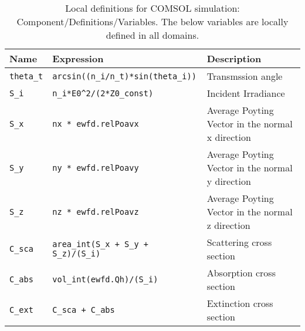 \begin{table}[b!]
\caption{Local definitions for COMSOL simulation: Component/Definitions/Variables. The below variables are locally defined in all domains. }
\label{tab:Domain-parameters}
\centering
\begin{tabular}{ |l|l|l| }
 \hline
 \textbf{Name}          &   \textbf{Expression}                         &    \textbf{Description} \\ \hline \hline
 \lstinline!theta_t!    &   \lstinline!arcsin((n_i/n_t)*sin(theta_i))!  &  Transmssion angle   \\
 \lstinline!S_i!        &   \lstinline!n_i*E0^2/(2*Z0_const)!           &    Incident Irradiance \\
 \lstinline!S_x!        &   \lstinline!nx * ewfd.relPoavx!              &    Average Poyting Vector in the normal x direction \\
 \lstinline!S_y!        &   \lstinline!ny * ewfd.relPoavy!              &    Average Poyting Vector in the normal y direction \\
 \lstinline!S_z!        &   \lstinline!nz * ewfd.relPoavz!              &    Average Poyting Vector in the normal z direction \\
 \lstinline!C_sca!      &   \lstinline!area_int(S_x + S_y + S_z)/(S_i)! &   Scattering cross section \\
 \lstinline!C_abs!      &   \lstinline!vol_int(ewfd.Qh)/(S_i)!          &   Absorption cross section \\
 \lstinline!C_ext!       &  \lstinline!C_sca + C_abs!                 &   Extinction cross section \\
 \hline \hline
\end{tabular}
\end{table}

